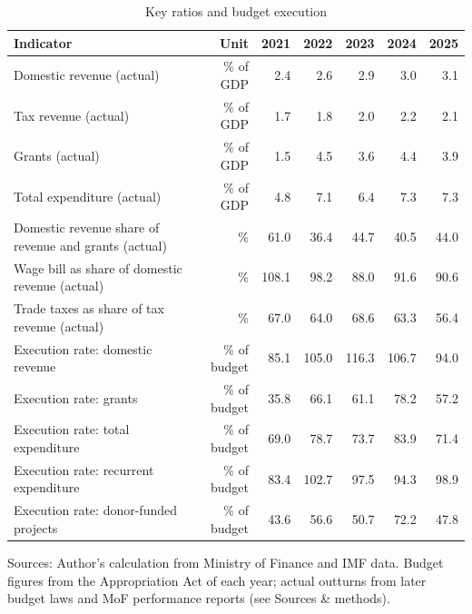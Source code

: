 \begin{table}[htbp]\centering
\caption{Key ratios and budget execution}
\begin{tabular}{lrrrrrr}
\toprule
Indicator & Unit & 2021 & 2022 & 2023 & 2024 & 2025 \\
\midrule
Domestic revenue (actual) & \% of GDP & 2.4 & 2.6 & 2.9 & 3.0 & 3.1 \\
Tax revenue (actual) & \% of GDP & 1.7 & 1.8 & 2.0 & 2.2 & 2.1 \\
Grants (actual) & \% of GDP & 1.5 & 4.5 & 3.6 & 4.4 & 3.9 \\
Total expenditure (actual) & \% of GDP & 4.8 & 7.1 & 6.4 & 7.3 & 7.3 \\
Domestic revenue share of revenue and grants (actual) & \% & 61.0 & 36.4 & 44.7 & 40.5 & 44.0 \\
Wage bill as share of domestic revenue (actual) & \% & 108.1 & 98.2 & 88.0 & 91.6 & 90.6 \\
Trade taxes as share of tax revenue (actual) & \% & 67.0 & 64.0 & 68.6 & 63.3 & 56.4 \\
Execution rate: domestic revenue & \% of budget & 85.1 & 105.0 & 116.3 & 106.7 & 94.0 \\
Execution rate: grants & \% of budget & 35.8 & 66.1 & 61.1 & 78.2 & 57.2 \\
Execution rate: total expenditure & \% of budget & 69.0 & 78.7 & 73.7 & 83.9 & 71.4 \\
Execution rate: recurrent expenditure & \% of budget & 83.4 & 102.7 & 97.5 & 94.3 & 98.9 \\
Execution rate: donor-funded projects & \% of budget & 43.6 & 56.6 & 50.7 & 72.2 & 47.8 \\
\bottomrule
\end{tabular}
\par\smallskip\footnotesize Sources: Author's calculation from Ministry of Finance and IMF data. Budget figures from the Appropriation Act of each year; actual outturns from later budget laws and MoF performance reports (see Sources \& methods).
\end{table}
